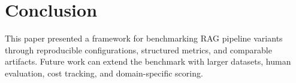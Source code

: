 \section{Conclusion}

This paper presented a framework for benchmarking RAG pipeline variants through reproducible configurations, structured metrics, and comparable artifacts. Future work can extend the benchmark with larger datasets, human evaluation, cost tracking, and domain-specific scoring.
